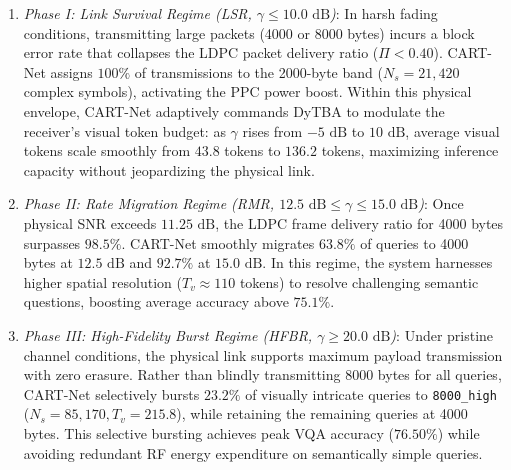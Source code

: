 \begin{enumerate}
    \item \textit{Phase I: Link Survival Regime (LSR, $\gamma \le 10.0\text{ dB}$)}:
    In harsh fading conditions, transmitting large packets (4000 or 8000 bytes) incurs a block error rate that collapses the LDPC packet delivery ratio ($\Pi < 0.40$). CART-Net assigns $100\%$ of transmissions to the 2000-byte band ($N_s = 21{,}420$ complex symbols), activating the PPC power boost. Within this physical envelope, CART-Net adaptively commands DyTBA to modulate the receiver's visual token budget: as $\gamma$ rises from $-5\text{ dB}$ to $10\text{ dB}$, average visual tokens scale smoothly from $43.8$ tokens to $136.2$ tokens, maximizing inference capacity without jeopardizing the physical link.
    
    \item \textit{Phase II: Rate Migration Regime (RMR, $12.5\text{ dB} \le \gamma \le 15.0\text{ dB}$)}:
    Once physical SNR exceeds $11.25\text{ dB}$, the LDPC frame delivery ratio for 4000 bytes surpasses $98.5\%$. CART-Net smoothly migrates $63.8\%$ of queries to 4000 bytes at $12.5\text{ dB}$ and $92.7\%$ at $15.0\text{ dB}$. In this regime, the system harnesses higher spatial resolution ($T_v \approx 110$ tokens) to resolve challenging semantic questions, boosting average accuracy above $75.1\%$.
    
    \item \textit{Phase III: High-Fidelity Burst Regime (HFBR, $\gamma \ge 20.0\text{ dB}$)}:
    Under pristine channel conditions, the physical link supports maximum payload transmission with zero erasure. Rather than blindly transmitting 8000 bytes for all queries, CART-Net selectively bursts $23.2\%$ of visually intricate queries to \texttt{8000\_high} ($N_s = 85{,}170, T_v = 215.8$), while retaining the remaining queries at 4000 bytes. This selective bursting achieves peak VQA accuracy ($76.50\%$) while avoiding redundant RF energy expenditure on semantically simple queries.
\end{enumerate}
